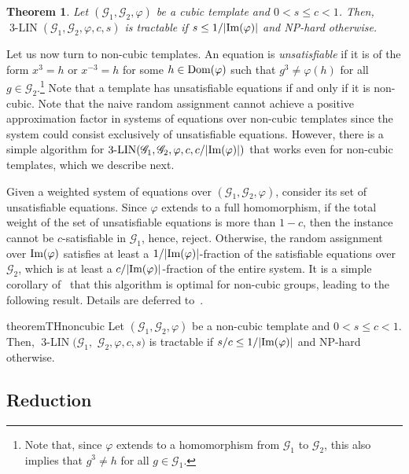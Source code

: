 \documentclass[a4paper,11pt]{article}
\newtheorem{theorem}{Theorem}[section]
\theoremstyle{definition}
\newcommand{\gr}{\mathscr{G}}
\newcommand{\im}{\textnormal{Im}}
\newcommand{\dom}{\textnormal{Dom}}
\newcommand{\eq}{\ensuremath{\operatorname{3-LIN}}}
\begin{document}
\begin{theorem}
\label{th:main-cubic}
    Let $(\gr_1, \gr_2, \varphi)$ be a cubic template 
    and $0<s\leq c<1$. Then, $\eq(\gr_1, \gr_2, \varphi, c, s)$ is tractable if $s \leq 1/|\im(\varphi)|$ and NP-hard otherwise.
\end{theorem}


Let us now turn to non-cubic templates. 
An equation is \emph{unsatisfiable} if it is
of the form $x^3=h$ or $x^{-3}=h$ for some $h\in \dom(\varphi)$ such that $g^3 \neq \varphi(h)$ for all $g \in \gr_2$.\footnote{Note
that, since $\varphi$ extends to a homomorphism from $\gr_1$ to $\gr_2$, this also implies
that $g^3 \neq h$ for all $g \in \gr_1$.}
Note that a
template has unsatisfiable equations if and only if it is non-cubic. Note that
the naive random assignment cannot achieve a positive approximation factor in
systems of equations over non-cubic templates since 
the system could consist exclusively of unsatisfiable equations. However, there is a simple
algorithm for $\eq(\gr_1,\gr_2,\varphi,c,c/|\im(\varphi)|)$ that works even for
non-cubic templates, which we describe next.

Given a weighted
system of equations over $(\gr_1,\gr_2,\varphi)$, consider its set of unsatisfiable equations. 
%
Since $\varphi$ extends to a full homomorphism, if the total weight of the set of unsatisfiable equations is more than $1-c$, then the instance cannot be $c$-satisfiable in $\gr_1$, hence, reject.
%
Otherwise, the random assignment over $\im(\varphi)$ satisfies at least a
$1/|\im(\varphi)|$-fraction of the satisfiable equations over $\gr_2$, which is at least a $c/|\im(\varphi)|$-fraction of the entire system. 
It is a simple corollary of~ that this algorithm is optimal for non-cubic groups, leading to the following result. Details are deferred to~.

\begin{restatable}{theorem}{THnoncubic}
\label{th:main-non-cubic}
    Let $(\gr_1, \gr_2, \varphi)$ be a non-cubic template 
    and $0<s\leq c<1$. Then, $\eq(\gr_1,$ $ \gr_2, \varphi, c, s)$ is tractable if $s/c \leq 1/|\im(\varphi)|$ and NP-hard otherwise.
\end{restatable}




\subsection{Reduction} \label{sec:reduction}
\end{document}
